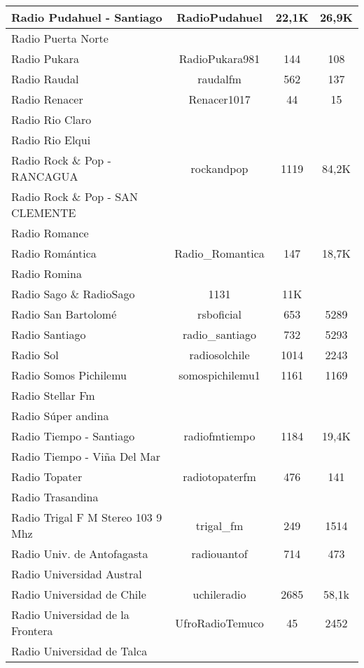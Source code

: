 \begin{center}
\begin{longtable}{| l | c | c | c |}
Radio Pudahuel - Santiago	&	RadioPudahuel	&	22,1K	&	26,9K	\\ \hline
Radio Puerta Norte	&		&		&		\\ \hline
Radio Pukara	&	RadioPukara981	&	144	&	108	\\ \hline
Radio Raudal	&	raudalfm	&	562	&	137	\\ \hline
Radio Renacer	&	Renacer1017	&	44	&	15	\\ \hline
Radio Rio Claro	&		&		&		\\ \hline
Radio Rio Elqui	&		&		&		\\ \hline
Radio Rock \& Pop - RANCAGUA	&	rockandpop	&	1119	&	84,2K	\\ \hline
Radio Rock \& Pop - SAN CLEMENTE	&		&		&		\\ \hline
Radio Romance	&		&		&		\\ \hline
Radio Romántica	&	Radio\_Romantica	&	147	&	18,7K	\\ \hline
Radio Romina	&		&		&		\\ \hline
Radio Sago	\&	RadioSago	&	1131	&	11K	\\ \hline
Radio San Bartolomé	&	rsboficial	&	653	&	5289	\\ \hline
Radio Santiago	&	radio\_santiago	&	732	&	5293	\\ \hline
Radio Sol	&	radiosolchile	&	1014	&	2243	\\ \hline
Radio Somos Pichilemu	&	somospichilemu1	&	1161	&	1169	\\ \hline
Radio Stellar Fm	&		&		&		\\ \hline
Radio Súper andina	&		&		&		\\ \hline
Radio Tiempo - Santiago	&	radiofmtiempo	&	1184	&	19,4K	\\ \hline
Radio Tiempo - Viña Del Mar	&		&		&		\\ \hline
Radio Topater	&	radiotopaterfm	&	476	&	141	\\ \hline
Radio Trasandina	&		&		&		\\ \hline
Radio Trigal F M Stereo 103 9 Mhz	&	trigal\_fm	&	249	&	1514	\\ \hline
Radio Univ. de Antofagasta	&	radiouantof	&	714	&	473	\\ \hline
Radio Universidad Austral	&		&		&		\\ \hline
Radio Universidad de Chile	&	uchileradio	&	2685	&	58,1k	\\ \hline
Radio Universidad de la Frontera	&	UfroRadioTemuco	&	45	&	2452	\\ \hline
Radio Universidad de Talca	&		&		&		\\ \hline

\end{longtable}
\end{center}
